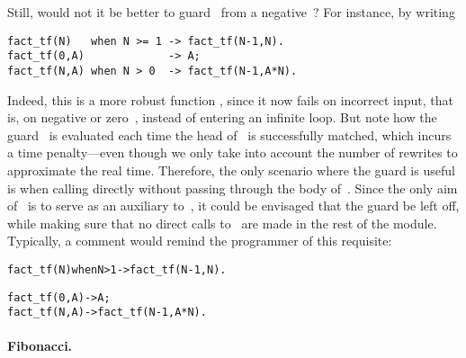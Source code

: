 Still, would not it be better to guard~ from
a negative~? For instance, by writing
\begin{verbatim}
fact_tf(N)   when N >= 1 -> fact_tf(N-1,N).
fact_tf(0,A)             -> A;
fact_tf(N,A) when N > 0  -> fact_tf(N-1,A*N).
\end{verbatim}
Indeed, this is a more robust function , since it
now fails on incorrect input, that is, on negative or
zero~, instead of entering an infinite loop. But note how
the guard~ is evaluated each time the head
of~ is successfully matched, which incurs a
time penalty---even though we only take into account the number of
rewrites to approximate the real time. Therefore, the only scenario
where the guard is useful is when calling directly
 without passing through the body
of~. Since the only aim of~ is
to serve as an auxiliary to~, it could be
envisaged that the guard be left off, while making sure that no direct
calls to~ are made in the rest of the
module. Typically, a comment would remind the programmer of this
requisite:
\begin{alltt}
fact_tf(N) when N > 1 -> fact_tf(N-1,N).

% fact_tf(N,A) \emph{assumes} N > 0.
fact_tf(0,A) -> A;
fact_tf(N,A) -> fact_tf(N-1,A*N).
\end{alltt}

\medskip

\paragraph{Fibonacci.}
\label{fibonacci}

